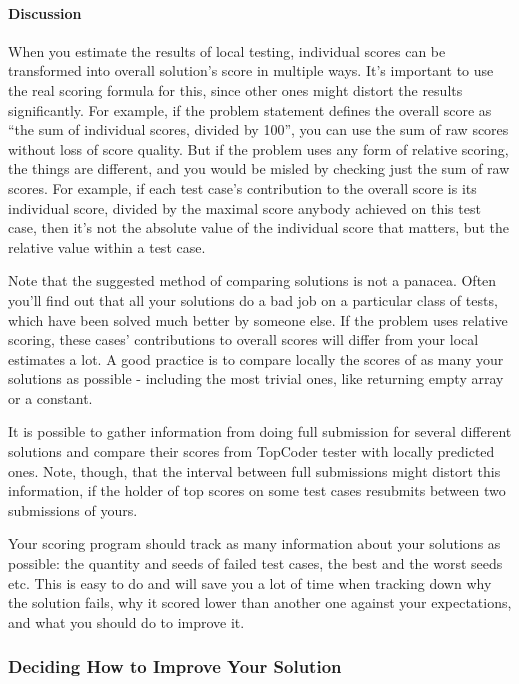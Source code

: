 \hypertarget{discussion-2}{%
\paragraph{Discussion}\label{discussion-2}}

When you estimate the results of local testing, individual scores can be
transformed into overall solution's score in multiple ways. It's
important to use the real scoring formula for this, since other ones
might distort the results significantly. For example, if the problem
statement defines the overall score as ``the sum of individual scores,
divided by 100'', you can use the sum of raw scores without loss of
score quality. But if the problem uses any form of relative scoring, the
things are different, and you would be misled by checking just the sum
of raw scores. For example, if each test case's contribution to the
overall score is its individual score, divided by the maximal score
anybody achieved on this test case, then it's not the absolute value of
the individual score that matters, but the relative value within a test
case.

Note that the suggested method of comparing solutions is not a panacea.
Often you'll find out that all your solutions do a bad job on a
particular class of tests, which have been solved much better by someone
else. If the problem uses relative scoring, these cases' contributions
to overall scores will differ from your local estimates a lot. A good
practice is to compare locally the scores of as many your solutions as
possible - including the most trivial ones, like returning empty array
or a constant.

It is possible to gather information from doing full submission for
several different solutions and compare their scores from TopCoder
tester with locally predicted ones. Note, though, that the interval
between full submissions might distort this information, if the holder
of top scores on some test cases resubmits between two submissions of
yours.

Your scoring program should track as many information about your
solutions as possible: the quantity and seeds of failed test cases, the
best and the worst seeds etc. This is easy to do and will save you a lot
of time when tracking down why the solution fails, why it scored lower
than another one against your expectations, and what you should do to
improve it.

\hypertarget{deciding-how-to-improve-your-solution}{%
\subsubsection{Deciding How to Improve Your
Solution}\label{deciding-how-to-improve-your-solution}}

